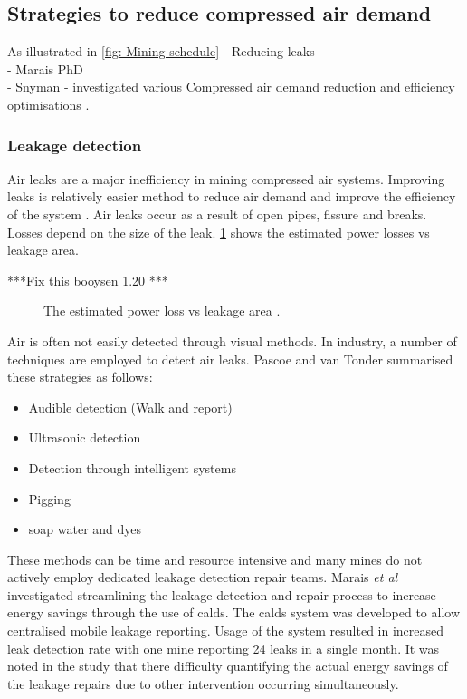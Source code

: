 	\subsection{Strategies to reduce compressed air demand}
	As illustrated in \cref{fig: Mining schedule}
		- Reducing leaks\\
		- Marais PhD\\
		- Snyman - investigated various Compressed air demand reduction and efficiency
		 optimisations \cite{Snyman2011Masters}.
		 
		 \subsubsection{Leakage detection}
		 Air leaks are a major inefficiency in mining compressed air systems. Improving leaks is relatively easier method to  reduce air demand and improve the efficiency of the system  \cite{van2011sustaining}. Air leaks occur as a result of open pipes, fissure and breaks. Losses depend on the size of the leak. \cref{fig: Leak losses} shows the estimated power losses vs leakage area.
		 \par
		 ***Fix this  booysen 1.20 ***
		 \begin{figure}[h]
		 	\centering
		 	
		 	\caption[The estimated power loss vs leakage area.]{ The estimated power loss vs leakage area \cite{van2011sustaining}.}
		 	\label{fig: Leak losses}
		 \end{figure}
		 Air is often not easily detected through visual methods. In industry, a number of techniques are employed to detect air leaks. Pascoe \cite{Pascoe2016Masters} and van Tonder \cite{vanTonder2010Masters} summarised these strategies as follows:
		 \begin{itemize}
		 	\item Audible detection (Walk and report)
		 	\item Ultrasonic detection
		 	\item Detection through intelligent systems
		 	\item Pigging
		 	\item soap water and dyes
		 \end{itemize}
	 	 These methods can be time and resource intensive and many mines do not actively employ dedicated leakage detection repair teams. Marais \textit{et al} \cite{marais2009increased} investigated streamlining the leakage detection and repair process to increase energy savings through the use of \gls{calds}. The \gls{calds} system was developed to allow centralised mobile leakage reporting. Usage of the system resulted in increased leak detection rate with one mine reporting 24 leaks in a single month. It was noted in the study that there difficulty quantifying the actual energy savings of the leakage repairs due to other intervention occurring simultaneously.	
		 
